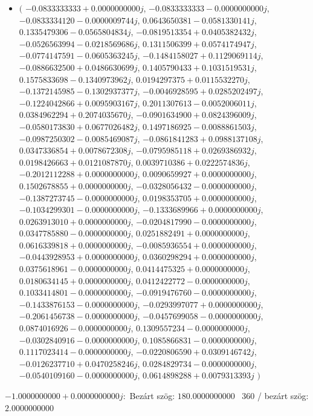\documentclass[14pt,a4paper]{article}
\begin{document}
\begin{itemize}
\item
$\big($
$-0.0833333333+0.0000000000j$, $-0.0833333333-0.0000000000j$, $-0.0833334120-0.0000009744j$, $0.0643650381-0.0581330141j$, $0.1335479306-0.0565804834j$, $-0.0819513354+0.0405382432j$, $-0.0526563994-0.0218569686j$, $0.1311506399+0.0574174947j$, $-0.0774147591-0.0605363245j$, $-0.1484158027+0.1129069114j$, $-0.0886632500+0.0486630699j$, $0.1405790433+0.1031519531j$, $0.1575833698-0.1340973962j$, $0.0194297375+0.0115532270j$, $-0.1372145985-0.1302937377j$, $-0.0046928595+0.0285202497j$, $-0.1224042866+0.0095903167j$, $0.2011307613-0.0052006011j$, $0.0384962294+0.2074035670j$, $-0.0901634900+0.0824396009j$, $-0.0580173830+0.0677026482j$, $0.1497186925-0.0088861503j$, $-0.0987250302-0.0085469087j$, $-0.0861841283+0.0988137108j$, $0.0347336854+0.0078672308j$, $-0.0795985118+0.0269386932j$, $0.0198426663+0.0121087870j$, $0.0039710386+0.0222574836j$, $-0.2012112288+0.0000000000j$, $0.0090659927+0.0000000000j$, $0.1502678855+0.0000000000j$, $-0.0328056432-0.0000000000j$, $-0.1387273745-0.0000000000j$, $0.0198353705+0.0000000000j$, $-0.1034299301-0.0000000000j$, $-0.1333689966+0.0000000000j$, $0.0263913010+0.0000000000j$, $-0.0204817990-0.0000000000j$, $0.0347785880-0.0000000000j$, $0.0251882491+0.0000000000j$, $0.0616339818+0.0000000000j$, $-0.0085936554+0.0000000000j$, $-0.0443928953+0.0000000000j$, $0.0360298294+0.0000000000j$, $0.0375618961-0.0000000000j$, $0.0414475325+0.0000000000j$, $0.0180634145+0.0000000000j$, $0.0412422772-0.0000000000j$, $0.1033414801-0.0000000000j$, $-0.0919476760-0.0000000000j$, $-0.1433876153-0.0000000000j$, $-0.0293997077+0.0000000000j$, $-0.2061456738-0.0000000000j$, $-0.0457699058-0.0000000000j$, $0.0874016926-0.0000000000j$, $0.1309557234-0.0000000000j$, $-0.0302840916-0.0000000000j$, $0.1085866831-0.0000000000j$, $0.1117023414-0.0000000000j$, $-0.0220806590+0.0309146742j$, $-0.0126237710+0.0470258246j$, $0.0284829734-0.0000000000j$, $-0.0540109160-0.0000000000j$, $0.0614898288+0.0079313393j$
$\big)$
\end{itemize}
$-1.0000000000+0.0000000000j$:\
Bezárt szög: $180.0000000000$ \
360 / bezárt szög: $2.0000000000$\
\end{document}
